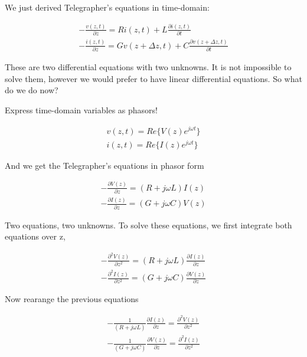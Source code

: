 We just derived Telegrapher's equations in time-domain:



\begin{eqnarray}
-\frac{v(z,t) }{\partial z}=R i(z,t)+L 
 \frac{\partial i(z,t)}{\partial t} \nonumber  \\ \nonumber
-\frac{i(z,t) }{\partial z}= G v(z+\Delta z,t)+C
\frac{\partial v(z+\Delta z,t)}{\partial t} 
\end{eqnarray}

These are two differential equations with two unknowns. It is not
impossible to solve them, however we would prefer to have linear differential
equations. So what do we do now?

Express time-domain variables as phasors!

\begin{eqnarray}
v(z,t)=Re\{ V(z) e^{j \omega t} \} \nonumber \\
i(z,t)=Re\{ I(z) e^{j \omega t} \} \nonumber
\end{eqnarray}

And we get the Telegrapher's equations in phasor form


\begin{eqnarray}
-\frac{\partial V(z)}{\partial z} = (R+j\omega L) I(z) \label{te1}\\
-\frac{\partial I(z)}{\partial z} = (G+j\omega C) V(z) \label{te2}
\end{eqnarray}



Two equations, two unknowns. To solve these equations, we first
integrate both equations over z, 

\begin{eqnarray}
-\frac{\partial^2 V(z)}{\partial z^2}=  (R+j\omega L) \frac{\partial
 I(z)}{\partial z}  \nonumber \\
-\frac{\partial^2 I(z)}{\partial z^2}=  (G+j\omega C) \frac{\partial
 V(z)}{\partial z} \nonumber
\end{eqnarray}

Now rearange the previous equations



\begin{eqnarray}
- \frac{1}{ (R+j\omega L)} \frac{\partial I(z)}{\partial z}= \frac{\partial^2
  V(z)}{\partial z^2} \label{te5} \\
-\frac{1}{ (G+j\omega C)} \frac{\partial V(z)}{\partial z}= \frac{\partial^2
  I(z)}{\partial z^2} \label{te6}
\end{eqnarray}

